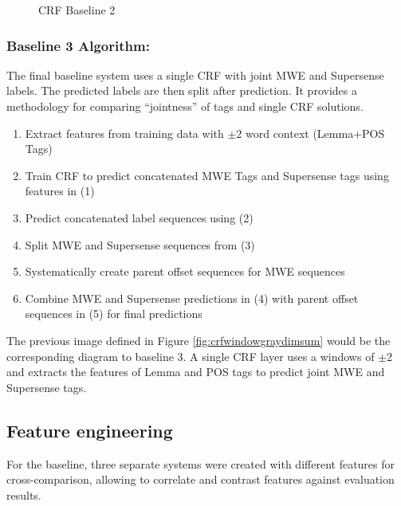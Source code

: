 \begin{figure}[H]
  \caption{CRF Baseline 2}
  \label{fig:crfbaseline2}
\end{figure}

\subsubsection{Baseline 3 Algorithm:}
The final baseline system uses a single CRF with joint MWE and Supersense labels. The predicted labels are then split after prediction. It provides a methodology for comparing ``jointness'' of tags and single CRF solutions. 

\begin{mdframed}[
    linewidth=0pt,
    roundcorner=4pt,
    backgroundcolor=gray!15,
    userdefinedwidth=\textwidth,
]
\begin{enumerate}
\tiny
  \setlength{\itemsep}{0pt}
  \setlength{\parskip}{0pt}
\item Extract features from training data with $\pm 2$ word context (Lemma+POS Tags)
\item Train CRF to predict concatenated MWE Tags and Supersense tags using features in (1)
\item Predict concatenated label sequences using (2)
\item Split MWE and Supersense sequences from (3)
\item Systematically create parent offset sequences for MWE sequences
\item Combine MWE and Supersense predictions in (4) with parent offset sequences in (5) for final predictions
\end{enumerate}
\end{mdframed}

The previous image defined in Figure \ref{fig:crfwindowgraydimsum} would be the corresponding diagram to baseline 3. A single CRF layer uses a windows of $\pm$2 and extracts the features of Lemma and POS tags to predict joint MWE and Supersense tags.

\subsection{Feature engineering}
For the baseline, three separate systems were created with different features for cross-comparison, allowing to correlate and contrast features against evaluation results. 


